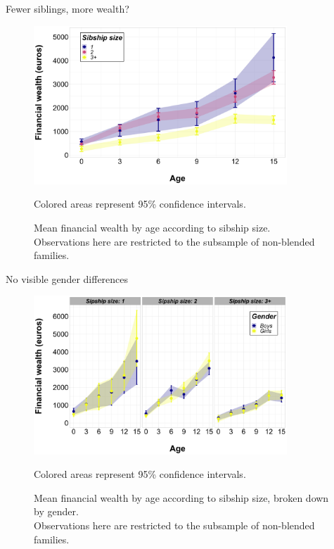 \documentclass[xolor = dvipsnames, compress]{beamer} %
\begin{document}


\begin{frame}[label = sibhip]{Fewer siblings, more wealth?}       
	\begin{figure}[h]
		\centering
		\includegraphics[width = 0.85\textwidth, height = 0.85\textheight, keepaspectratio]{wealth_age3_sibsize3_all.png}
		\vspace{-0.3cm}
		\caption*{\tiny{Colored areas represent 95\% confidence intervals.}}
		\vspace{-0.5cm}
		\caption{\scriptsize{Mean financial wealth by age according to sibship size.
		\\
		Observations here are restricted to the subsample of non-blended families.}}
	\end{figure}
\end{frame}


\begin{frame}[label = gender_sibhip]{No visible gender differences}    
	\begin{figure}[h]
		\centering
		\includegraphics[width = 0.85\textwidth, height = 0.85\textheight, keepaspectratio]{wealth_age3_sexe_sibsize3_within.png}
		\vspace{-0.3cm}
		\caption*{\tiny{Colored areas represent 95\% confidence intervals.}}
		\vspace{-0.5cm}
		\caption{\scriptsize{Mean financial wealth by age according to sibship size, broken down by gender.
		\\
		Observations here are restricted to the subsample of non-blended families.}}
	\end{figure}
\end{frame}
\end{document}
